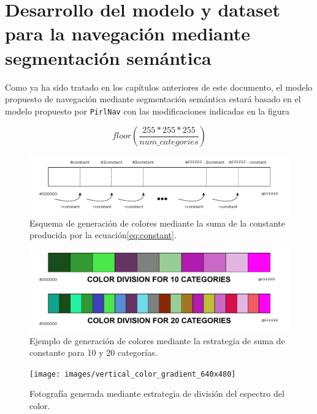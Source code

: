 \chapter{Desarrollo del modelo y dataset para la navegación mediante segmentación semántica}\label{ch:desarrollo-del-modelo-y-dataset-para-la-navegacion-mediante-segmentacion-semantica}

Como ya ha sido tratado en los capítulos anteriores de este documento, el modelo propuesto de navegación mediante segmentación semántica estará basado en el modelo propuesto por \texttt{PirlNav}\citep{ramrakhya2023} con las modificaciones indicadas en la figura



\begin{equation}
  floor(\frac{255*255*255}{num\_categories})\label{eq:constant}
\end{equation}
\begin{figure}
    \centering
    \includegraphics[width=\textwidth]{figuras/colored_scheme.drawio}
    \caption{Esquema de generación de colores mediante la suma de la constante producida por la ecuación\ref{eq:constant}.}
    \label{fig:constant_scheme}
\end{figure}
\begin{figure}
    \centering
    \includegraphics[width=\textwidth]{figuras/morecolored_scheme.drawio}
    \caption{ Ejemplo de generación de colores mediante la estrategia de suma de constante para 10 y 20 categorías.}
    \label{fig:colored_scheme}
\end{figure}
\begin{figure}
    \centering
    \texttt{[image: images/vertical\_color\_gradient\_640x480]}
    \caption{ Fotografía generada mediante estrategia de división del espectro del color.}
    \label{fig:colorinchis}
\end{figure}